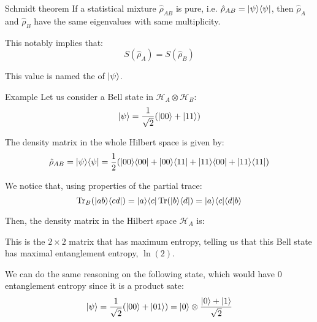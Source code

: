\documentclass[a4paper]{article}
\begin{document}
\begin{parag}{Schmidt theorem}
    If a statistical mixture $\hat{\rho}_{AB}$ is pure, i.e. $\hat{\rho}_{AB} = \ket{\psi}\bra{\psi}$, then $\hat{\rho}_A$ and $\hat{\rho}_B$ have the same eigenvalues with same multiplicity. 

    This notably implies that:
    \[S\left(\hat{\rho}_A\right) = S\left(\hat{\rho}_B\right)\]
    
    This value is named the  of $\ket{\psi}$. 

    \begin{subparag}{Example}
        Let us consider a Bell state in $\mathcal{H}_A \otimes \mathcal{H}_B$: 
        \[\ket{\psi} = \frac{1}{\sqrt{2}} \left(\ket{00} + \ket{11}\right)\]
        
        The density matrix in the whole Hilbert space is given by: 
        \[\hat{\rho}_{AB} = \ket{\psi}\bra{\psi} = \frac{1}{2}\left(\ket{00}\bra{00} + \ket{00}\bra{11} + \ket{11}\bra{00} + \ket{11}\bra{11}\right)\]

        We notice that, using properties of the partial trace: 
        \[\Tr_{B}\left(\ket{ab}\bra{cd}\right) = \ket{a}\bra{c} \Tr\left(\ket{b}\bra{d}\right) = \ket{a}\bra{c} \braket{d}{b}\]
        
        Then, the density matrix in the Hilbert space $\mathcal{H}_A$ is: 
        
        This is the $2\times2$ matrix that has maximum entropy, telling us that this Bell state has maximal entanglement entropy, $\ln\left(2\right)$.

        We can do the same reasoning on the following state, which would have 0 entanglement entropy since it is a product sate: 
        \[\ket{\psi} = \frac{1}{\sqrt{2}}\left(\ket{00} + \ket{01}\right) =  \ket{0} \otimes \frac{\ket{0} + \ket{1}}{\sqrt{2}}\]
    \end{subparag}
\end{parag}
\end{document}
